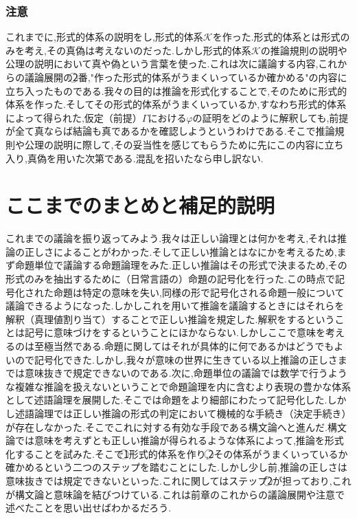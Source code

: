 \documentclass[10pt,b5paper,papersize,dvipdfmx]{jsbook}
\begin{document}
\subsubsection{注意}
これまでに,形式的体系の説明をし,形式的体系$\mathcal K$を作った.形式的体系とは形式のみを考え,その真偽は考えないのだった.しかし$形式的体系\mathcal K$の推論規則の説明や公理の説明において真や偽という言葉を使った.これは次に議論する内容,これからの議論展開の\textcircled{\scriptsize 2}番,"作った形式的体系がうまくいっているか確かめる"の内容に立ち入ったものである.我々の目的は推論を形式化することで,そのために形式的体系を作った.そしてその形式的体系がうまくいっているか,すなわち形式的体系によって得られた,仮定（前提）$\Gamma$における$\varphi$の証明をどのように解釈しても,前提が全て真ならば結論も真であるかを確認しようというわけである.そこで推論規則や公理の説明に際して,その妥当性を感じてもらうために先にこの内容に立ち入り,真偽を用いた次第である.混乱を招いたなら申し訳ない.

\section{ここまでのまとめと補足的説明}
これまでの議論を振り返ってみよう.我々は正しい論理とは何かを考え,それは推論の正しさによることがわかった.そして正しい推論とはなにかを考えるため,まず命題単位で議論する命題論理をみた.正しい推論はその形式で決まるため,その形式のみを抽出するために（日常言語の）命題の記号化を行った.この時点で記号化された命題は特定の意味を失い,同様の形で記号化される命題一般について議論できるようになった.しかしこれを用いて推論を議論するときにはそれらを解釈（真理値割り当て）することで正しい推論を規定した.解釈をするということは記号に意味づけをするということにほかならない.しかしここで意味を考えるのは至極当然である.命題に関してはそれが具体的に何であるかはどうでもよいので記号化できた.しかし,我々が意味の世界に生きている以上推論の正しさまでは意味抜きで規定できないのである.次に,命題単位の議論では数学で行うような複雑な推論を扱えないということで命題論理を内に含むより表現の豊かな体系として述語論理を展開した.そこでは命題をより細部にわたって記号化した.しかし述語論理では正しい推論の形式の判定において機械的な手続き（決定手続き）が存在しなかった.そこでこれに対する有効な手段である構文論へと進んだ.構文論では意味を考えずとも正しい推論が得られるような体系によって,推論を形式化することを試みた.そこで\textcircled{\scriptsize 1}形式的体系を作り,\textcircled{\scriptsize 2}その体系がうまくいっているか確かめるという二つのステップを踏むことにした.しかし少し前,推論の正しさは意味抜きでは規定できないといった.これに関してはステップ\textcircled{\scriptsize 2}が担っており,これが構文論と意味論を結びつけている.これは前章のこれからの議論展開や注意で述べたことを思い出せばわかるだろう.
\end{document}
